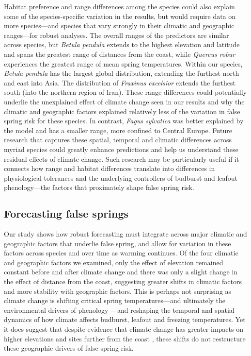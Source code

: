 \documentclass{article}\usepackage[]{graphicx}\usepackage[]{color}
\begin{document}
Habitat preference and range differences among the species could also explain some of the species-specific variation in the results, but would require data on more species---and species that vary strongly in their climatic and geographic ranges---for robust analyses. The overall ranges of the predictors are similar across species, but \textit{Betula pendula} extends to the highest elevation and latitude and spans the greatest range of distances from the coast, while \textit{Quercus robur} experiences the greatest range of mean spring temperatures. Within our species, \textit{Betula pendula} has the largest global distribution, extending the furthest north and east into Asia. The distribution of \textit{Fraxinus excelsior} extends the furthest south (into the northern region of Iran). These range differences could potentially underlie the unexplained effect of climate change seen in our results and why the climatic and geographic factors explained relatively less of the variation in false spring risk for these species. In contrast, \textit{Fagus sylvatica} was better explained by the model and has a smaller range, more confined to Central Europe. Future research that captures these spatial, temporal and climatic differences across myriad species could greatly enhance predictions and help us understand these residual effects of climate change. Such research may be particularly useful if it connects how range and habitat differences translate into differences in physiological tolerances and the underlying controllers of budburst and leafout phenology---the factors that proximately shape false spring risk. %


\subsection*{Forecasting false springs}
Our study shows how robust forecasting must integrate across major climatic and geographic factors that underlie false spring, and allow for variation in these factors across species and over time as warming continues. Of the four climatic and geographic factors we examined, only the effect of elevation remained constant before and after climate change and there was only a slight change in the effect of distance from the coast, suggesting greater shifts in climatic factors and more stability with geographic factors. This is perhaps not surprising as climate change is shifting critical spring temperatures---and ultimately the environmental drivers of phenology \citep{Gauzere2019}---and reshaping the temporal and spatial dynamics of how climate affects budburst, leafout and freezing temperatures.  Yet it does suggest that despite evidence that climate change has greater impacts on higher elevations and sites further from the coast \citep{Giorgi1997,Rangwala2012,Pepin2015,Vitasse2018}, these shifts do not restructure these geographic drivers of false spring risk.  
\end{document}
